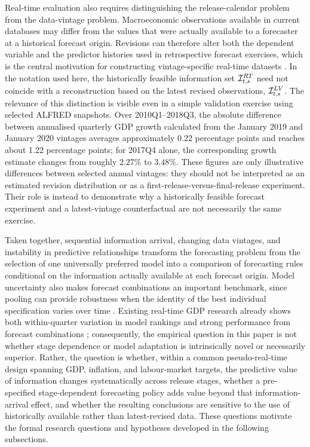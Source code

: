 Real-time evaluation also requires distinguishing the release-calendar problem
from the data-vintage problem. Macroeconomic observations available in current
databases may differ from the values that were actually available to a
forecaster at a historical forecast origin. Revisions can therefore alter both
the dependent variable and the predictor histories used in retrospective
forecast exercises, which is the central motivation for constructing
vintage-specific real-time datasets \citep{croushorestark2001realtime,
croushore2011frontiers}. In the notation used here, the historically feasible
information set $\mathcal{I}_{t,s}^{RT}$ need not coincide with a reconstruction based
on the latest revised observations, $\mathcal{I}_{t,s}^{LV}$. The relevance of this
distinction is visible even in a simple validation exercise using selected
ALFRED snapshots. Over 2010Q1--2018Q3, the absolute difference between
annualised quarterly GDP growth calculated from the January 2019 and January
2020 vintages averages approximately 0.22 percentage points and reaches about
1.22 percentage points; for 2017Q4 alone, the corresponding growth estimate
changes from roughly $2.27\%$ to $3.48\%$. These figures are only illustrative
differences between selected annual vintages: they should not be interpreted as
an estimated revision distribution or as a first-release-versus-final-release
experiment. Their role is instead to demonstrate why a historically feasible
forecast experiment and a latest-vintage counterfactual are not necessarily the
same exercise.

Taken together, sequential information arrival, changing data vintages, and
instability in predictive relationships transform the forecasting problem from
the selection of one universally preferred model into a comparison of
forecasting rules conditional on the information actually available at each
forecast origin. Model uncertainty also makes forecast combinations an
important benchmark, since pooling can provide robustness when the identity of
the best individual specification varies over time
\citep{timmermann2006combinations}. Existing real-time GDP research already
shows both within-quarter variation in model rankings and strong performance
from forecast combinations \citep{aastveit2014density}; consequently, the
empirical question in this paper is not whether stage dependence or model
adaptation is intrinsically novel or necessarily superior. Rather, the question
is whether, within a common pseudo-real-time design spanning GDP, inflation,
and labour-market targets, the predictive value of information changes
systematically across release stages, whether a pre-specified
stage-dependent forecasting policy adds value beyond that information-arrival
effect, and whether the resulting conclusions are sensitive to the use of
historically available rather than latest-revised data. These questions motivate
the formal research questions and hypotheses developed in the following
subsections.

